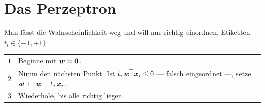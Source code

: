 \section{Das Perzeptron}

\begin{merksatz}
Man lässt die Wahrscheinlichkeit weg und will nur richtig einordnen. Etiketten $t_i \in \{-1,+1\}$.

\begin{center}
{\small
\renewcommand{\arraystretch}{1.5}
\begin{tabular}{@{}P{1.0cm}P{7.4cm}@{}}
\toprule
$1$ & Beginne mit $\boldsymbol{w} = \boldsymbol{0}$.\\
$2$ & Nimm den nächsten Punkt. Ist $t_i\,\boldsymbol{w}^{\!\top}\boldsymbol{x}_i \le 0$ --- falsch eingeordnet ---, setze $\boldsymbol{w} \leftarrow \boldsymbol{w} + t_i\,\boldsymbol{x}_i$.\\
$3$ & Wiederhole, bis alle richtig liegen.\\
\bottomrule
\end{tabular}}
\end{center}

\begin{center}
\begin{minipage}{0.88\textwidth}
\end{minipage}
\end{center}
\end{merksatz}

